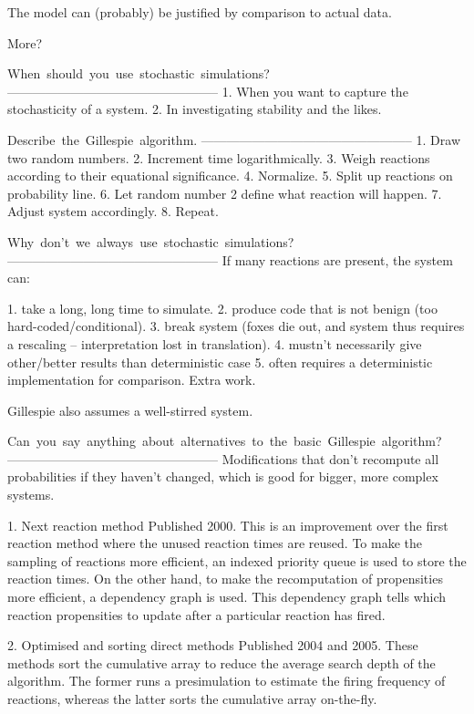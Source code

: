 The model can (probably) be justified by comparison to actual data. 

More? 

When should you use stochastic simulations?
--------------------------------------------------
1. When you want to capture the stochasticity of a system. 
2. In investigating stability and the likes.

Describe the Gillespie algorithm.
--------------------------------------------------
1. Draw two random numbers. 
2. Increment time logarithmically. 
3. Weigh reactions according to their equational significance.
4. Normalize.
5. Split up reactions on probability line. 
6. Let random number 2 define what reaction will happen.
7. Adjust system accordingly.
8. Repeat.

Why don't we always use stochastic simulations?
--------------------------------------------------
If many reactions are present, the system can:

1. take a long, long time to simulate.
2. produce code that is not benign (too hard-coded/conditional). 
3. break system (foxes die out, and system thus requires a rescaling --
interpretation lost in translation). 
4. mustn't necessarily give other/better results than deterministic case
5. often requires a deterministic implementation for comparison. Extra work. 

Gillespie also assumes a well-stirred system. 

Can you say anything about alternatives to the basic Gillespie algorithm?
--------------------------------------------------
Modifications that don't recompute all probabilities if they haven't changed,
which is good for bigger, more complex systems.  

1. Next reaction method
Published 2000. This is an improvement over the first reaction method where 
the unused reaction times are reused. To make the sampling of reactions more 
efficient, an indexed priority queue is used to store the reaction times. On 
the other hand, to make the recomputation of propensities more efficient, a 
dependency graph is used. This dependency graph tells which reaction 
propensities to update after a particular reaction has fired.

2. Optimised and sorting direct methods
Published 2004 and 2005. These methods sort the cumulative array to reduce 
the average search depth of the algorithm. The former runs a presimulation to 
estimate the firing frequency of reactions, whereas the latter sorts the 
cumulative array on-the-fly.

